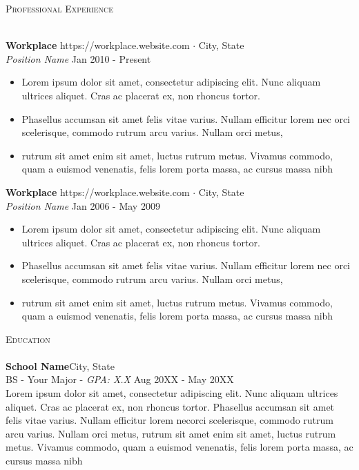 \documentclass[a4paper]{article}
\newcommand{\lineunder} {
    \vspace*{-8pt} \\
    \hspace*{-18pt} \hrulefill \\
}
\newcommand{\header} [1] {
    {\hspace*{-18pt}\vspace*{6pt} \textsc{#1}}
    \vspace*{-6pt} \lineunder
}
\begin{document}
\header{Professional Experience}
\vspace{1mm}

\textbf{Workplace} \hfill https://workplace.website.com $\cdot$ City, State\\
\textit{Position Name} \hfill Jan 2010 - Present\\
\vspace{-1mm}
\begin{itemize} \itemsep 1pt
	\item Lorem ipsum dolor sit amet, consectetur adipiscing elit.
    Nunc aliquam ultrices aliquet. Cras ac placerat ex, non rhoncus tortor.
    \item Phasellus accumsan sit amet felis vitae varius. Nullam efficitur lorem nec
    orci scelerisque, commodo rutrum arcu varius. Nullam orci metus,
    \item rutrum sit amet enim sit amet, luctus rutrum metus. Vivamus commodo, 
    quam a euismod venenatis, felis lorem porta massa, ac cursus massa nibh 
\end{itemize}

\textbf{Workplace} \hfill https://workplace.website.com $\cdot$ City, State\\
\textit{Position Name} \hfill Jan 2006 - May 2009\\
\vspace{-1mm}
\begin{itemize} \itemsep 1pt
	\item Lorem ipsum dolor sit amet, consectetur adipiscing elit.
    Nunc aliquam ultrices aliquet. Cras ac placerat ex, non rhoncus tortor.
    \item Phasellus accumsan sit amet felis vitae varius. Nullam efficitur lorem nec
    orci scelerisque, commodo rutrum arcu varius. Nullam orci metus,
    \item rutrum sit amet enim sit amet, luctus rutrum metus. Vivamus commodo, 
    quam a euismod venenatis, felis lorem porta massa, ac cursus massa nibh 
\end{itemize}

\header{Education}
\vspace{1mm}
\textbf{School Name}\hfill City, State\\
BS - Your Major - \textit{GPA: X.X} \hfill Aug 20XX - May 20XX\\

Lorem ipsum dolor sit amet, consectetur adipiscing elit. Nunc aliquam ultrices aliquet. 
Cras ac placerat ex, non rhoncus tortor. Phasellus accumsan sit amet felis vitae varius. 
Nullam efficitur lorem necorci scelerisque, commodo rutrum arcu varius. Nullam orci metus,
rutrum sit amet enim sit amet, luctus rutrum metus. Vivamus commodo, 
quam a euismod venenatis, felis lorem porta massa, ac cursus massa nibh 
\vspace{2mm}
\end{document}
